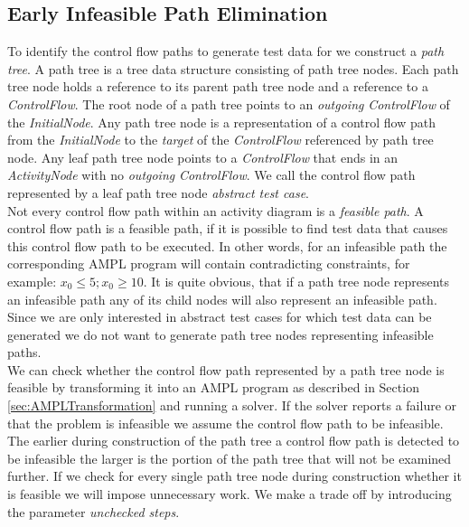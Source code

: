 \documentclass[runningheads,a4paper]{llncs}%
\newcommand{\UMLType}[1]{\textsf{\textit{#1}}} %
\newcommand{\UMLReference}[1]{\textsf{\textit{#1}}} %
\begin{document}
\subsection{Early Infeasible Path Elimination}%
\label{sec:InfeasiblePathElimination}%
To identify the control flow paths to generate test data for we construct a \emph{path tree}. A path tree is a tree data structure consisting of path tree nodes. Each path tree node holds a reference to its parent path tree node and a reference to a \UMLType{ControlFlow}. The root node of a path tree points to an \UMLReference{outgoing} \UMLType{ControlFlow} of the \UMLType{InitialNode}. Any path tree node is a representation of a control flow path from the \UMLType{InitialNode} to the \UMLReference{target} of the \UMLType{ControlFlow} referenced by path tree node. Any leaf path tree node points to a \UMLType{ControlFlow} that ends in an \UMLType{ActivityNode} with no \UMLReference{outgoing} \UMLType{ControlFlow}. We call the control flow path represented by a leaf path tree node \emph{abstract test case}.\\
Not every control flow path within an activity diagram is a \emph{feasible path}. A control flow path is a feasible path, if it is possible to find test data that causes this control flow path to be executed. In other words, for an infeasible path the corresponding AMPL program will contain contradicting constraints, for example: $x_0\leq5; x_0\geq10$. It is quite obvious, that if a path tree node represents an infeasible path any of its child nodes will also represent an infeasible path. Since we are only interested in abstract test cases for which test data can be generated we do not want to generate path tree nodes representing infeasible paths.\\
We can check whether the control flow path represented by a path tree node is feasible by transforming it into an AMPL program as described in Section \ref{sec:AMPLTransformation} and running a solver. If the solver reports a failure or that the problem is infeasible we assume the control flow path to be infeasible. The earlier during construction of the path tree a control flow path is detected to be infeasible the larger is the portion of the path tree that will not be examined further. If we check for every single path tree node during construction whether it is feasible we will impose unnecessary work. We make a trade off by introducing the parameter \emph{unchecked steps}.%
\end{document}
